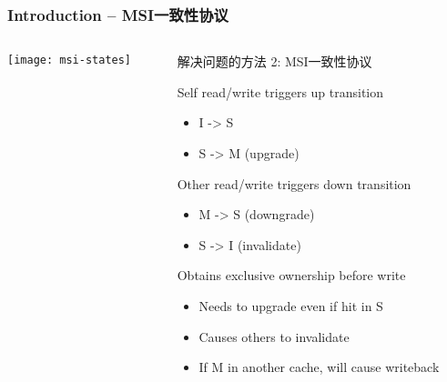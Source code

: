 \begin{frame}[plain]	
	\frametitle{Introduction -- MSI一致性协议}
	
	
	\begin{columns}
		
		\begin{column}{.4\textwidth}
			\texttt{[image: msi-states]}
		\end{column}
		\begin{column}{.6\textwidth}
			解决问题的方法 2: MSI一致性协议
			
			Self read/write triggers up transition
			\begin{itemize}
				\item  I -> S				
				\item  S -> M (upgrade)				
			\end{itemize}
			Other read/write triggers down transition
			\begin{itemize}
				\item  M -> S (downgrade)			
				\item  S -> I (invalidate)				
			\end{itemize}			
			Obtains exclusive ownership before write
			\begin{itemize}
				\item  Needs to upgrade even if hit in S			
				\item Causes others to invalidate
				\item If M in another cache, will cause writeback

			\end{itemize}					
		\end{column}
	\end{columns}
	
\end{frame}
